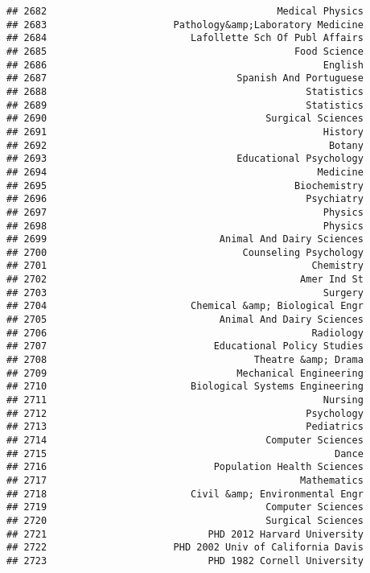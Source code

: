 \documentclass[
]{article}
\begin{document}
\begin{verbatim}
## 2682                                        Medical Physics
## 2683                      Pathology&amp;Laboratory Medicine
## 2684                         Lafollette Sch Of Publ Affairs
## 2685                                           Food Science
## 2686                                                English
## 2687                                 Spanish And Portuguese
## 2688                                             Statistics
## 2689                                             Statistics
## 2690                                      Surgical Sciences
## 2691                                                History
## 2692                                                 Botany
## 2693                                 Educational Psychology
## 2694                                               Medicine
## 2695                                           Biochemistry
## 2696                                             Psychiatry
## 2697                                                Physics
## 2698                                                Physics
## 2699                              Animal And Dairy Sciences
## 2700                                  Counseling Psychology
## 2701                                              Chemistry
## 2702                                            Amer Ind St
## 2703                                                Surgery
## 2704                         Chemical &amp; Biological Engr
## 2705                              Animal And Dairy Sciences
## 2706                                              Radiology
## 2707                             Educational Policy Studies
## 2708                                    Theatre &amp; Drama
## 2709                                 Mechanical Engineering
## 2710                         Biological Systems Engineering
## 2711                                                Nursing
## 2712                                             Psychology
## 2713                                             Pediatrics
## 2714                                      Computer Sciences
## 2715                                                  Dance
## 2716                             Population Health Sciences
## 2717                                            Mathematics
## 2718                         Civil &amp; Environmental Engr
## 2719                                      Computer Sciences
## 2720                                      Surgical Sciences
## 2721                            PHD 2012 Harvard University
## 2722                      PHD 2002 Univ of California Davis
## 2723                            PHD 1982 Cornell University

\end{verbatim}
\end{document}
